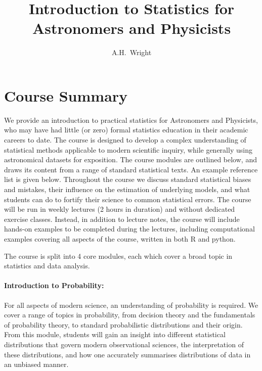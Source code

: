 \documentclass[useams,useamsmath,usenatbib]{mnras}
\begin{document}
\onecolumn

\title[AstroStatistics]{Introduction to Statistics for Astronomers and Physicists}

\author[A.H. Wright]
{A.H.~Wright}
\maketitle
\label{firstpage}

\section{Course Summary}\label{sec: intro} %
We provide an introduction to practical statistics for Astronomers and Physicists, who may have had little (or zero)
formal statistics education in their academic careers to date. The course is designed to develop a complex understanding
of statistical methods applicable to modern scientific inquiry, while generally using astronomical datasets for
exposition. The course modules are outlined below, and draws its content from a range of standard statistical texts. An
example reference list is given below.  Throughout the course we discuss standard statistical biases and mistakes, their
influence on the estimation of underlying models, and what students can do to fortify their science to common
statistical errors. The course will be run in weekly lectures (2 hours in duration) and without dedicated exercise
classes. Instead, in addition to lecture notes, the course will include hands-on examples to be completed during the
lectures, including computational examples covering all aspects of the course, written in both R and python. 

The course is split into 4 core modules, each which cover a broad topic in statistics and data analysis. 
\paragraph*{Introduction to Probability: }
For all aspects of modern science, an understanding of probability is required. We cover a range of topics in
probability, from decision theory and the fundamentals of probability theory, to standard probabilistic distributions
and their origin.  From this module, students will gain an insight into different statistical distributions that govern
modern observational sciences, the interpretation of these distributions, and how one accurately summarises
distributions of data in an unbiased manner. 
\end{document}
